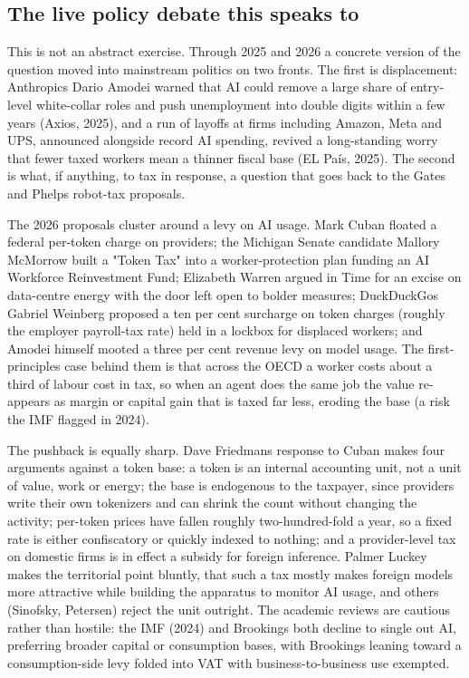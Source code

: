 \documentclass[12pt]{article}
\begin{document}
\hypertarget{the-live-policy-debate-this-speaks-to}{%
\subsection{The live policy debate this speaks
to}\label{the-live-policy-debate-this-speaks-to}}

This is not an abstract exercise. Through 2025 and 2026 a concrete
version of the question moved into mainstream politics on two fronts.
The first is displacement: Anthropic\textquotesingle s Dario Amodei
warned that AI could remove a large share of entry-level white-collar
roles and push unemployment into double digits within a few years
(Axios, 2025), and a run of layoffs at firms including Amazon, Meta and
UPS, announced alongside record AI spending, revived a long-standing
worry that fewer taxed workers mean a thinner fiscal base (EL País,
2025). The second is what, if anything, to tax in response, a question
that goes back to the Gates and Phelps robot-tax proposals.

The 2026 proposals cluster around a levy on AI usage. Mark Cuban floated
a federal per-token charge on providers; the Michigan Senate candidate
Mallory McMorrow built a "Token Tax" into a worker-protection plan
funding an AI Workforce Reinvestment Fund; Elizabeth Warren argued in
Time for an excise on data-centre energy with the door left open to
bolder measures; DuckDuckGo\textquotesingle s Gabriel Weinberg proposed
a ten per cent surcharge on token charges (roughly the employer
payroll-tax rate) held in a lockbox for displaced workers; and Amodei
himself mooted a three per cent revenue levy on model usage. The
first-principles case behind them is that across the OECD a worker costs
about a third of labour cost in tax, so when an agent does the same job
the value re-appears as margin or capital gain that is taxed far less,
eroding the base (a risk the IMF flagged in 2024).

The pushback is equally sharp. Dave Friedman\textquotesingle s response
to Cuban makes four arguments against a token base: a token is an
internal accounting unit, not a unit of value, work or energy; the base
is endogenous to the taxpayer, since providers write their own
tokenizers and can shrink the count without changing the activity;
per-token prices have fallen roughly two-hundred-fold a year, so a fixed
rate is either confiscatory or quickly indexed to nothing; and a
provider-level tax on domestic firms is in effect a subsidy for foreign
inference. Palmer Luckey makes the territorial point bluntly, that such
a tax mostly makes foreign models more attractive while building the
apparatus to monitor AI usage, and others (Sinofsky, Petersen) reject
the unit outright. The academic reviews are cautious rather than
hostile: the IMF (2024) and Brookings both decline to single out AI,
preferring broader capital or consumption bases, with Brookings leaning
toward a consumption-side levy folded into VAT with business-to-business
use exempted.
\end{document}
